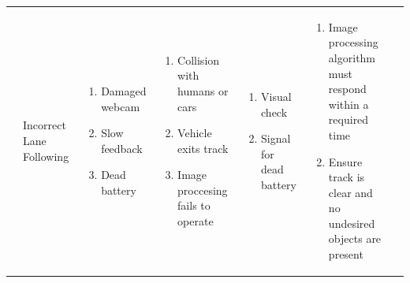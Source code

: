 \documentclass [10pt]{article}
\begin{document}
{\begin{minipage}{\textwidth}
\begin{longtable}{ |p{ }  | p{ } |  p{ } |  p{ } | p{ } | p{ } |  p{ }|}
    \cellcolor{subsectionC}
    &  \cellcolor{tableCell}\begin{minipage} {.19\columnwidth}
            \begin{center}Incorrect  Lane Following \end{center}
        \end{minipage} 
    & \begin{minipage}{.22\textwidth} 
                \begin{enumerate}
                    \item Damaged webcam
                    \item Slow feedback
                    \item Dead battery \vspace {1mm}
                \end{enumerate}
        \end{minipage}
    & \cellcolor{tableCell}\begin{minipage}{.22\textwidth} 
                \vspace{2mm}
                \begin{enumerate}
                    \item Collision with humans or cars
                    \item Vehicle exits track
                    \item Image proccesing fails to operate \vspace {1mm}
                \end{enumerate}
        \end{minipage}
    & \begin{minipage}{.18\textwidth} 
                \begin{enumerate}
                    \item Visual check
                    \item Signal for dead battery \vspace {1mm}
                \end{enumerate}
        \end{minipage}
    & \cellcolor{tableCell}\begin{minipage}{.23\textwidth} 
                \vspace{2mm}
                \begin{enumerate}
                    \item Image processing algorithm must respond within a required time
                    \item Ensure track is clear and no undesired objects are present\vspace {1mm}
                \end{enumerate}
        \end{minipage}
    

\end{longtable}
\end{minipage}}
\end{document}
